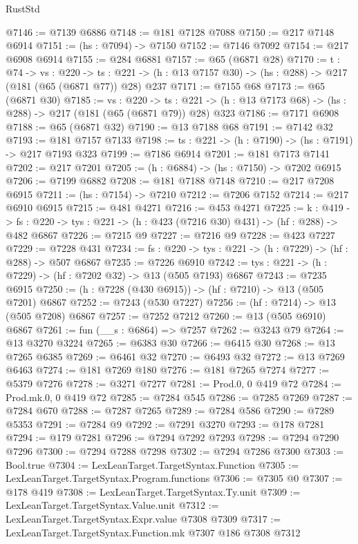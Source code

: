 \begin{lexlean}{RustStd}
\begin{coremodule}
@7146 := @7139 @6886
@7148 := @181 @7128 @7088
@7150 := @217 @7148 @6914
@7151 := (hs : @7094) -> @7150
@7152 := @7146 @7092
@7154 := @217 @6908 @6914
@7155 := @284 @6881
@7157 := @65 (@6871 @28)
@7170 := {t : @74} ->
  {vs : @220} ->
  {ts : @221} -> (h : @13 @7157 @30) -> (hs : @288) -> @217 (@181 (@65 (@6871 @77)) @28) @237
@7171 := @7155 @68
@7173 := @65 (@6871 @30)
@7185 := {vs : @220} ->
  {ts : @221} -> (h : @13 @7173 @68) -> (hs : @288) -> @217 (@181 (@65 (@6871 @79)) @28) @323
@7186 := @7171 @6908
@7188 := @65 (@6871 @32)
@7190 := @13 @7188 @68
@7191 := @7142 @32
@7193 := @181 @7157 @7133
@7198 := {ts : @221} -> (h : @7190) -> (hs : @7191) -> @217 @7193 @323
@7199 := @7186 @6914
@7201 := @181 @7173 @7141
@7202 := @217 @7201
@7205 := (h : @6884) -> (hs : @7150) -> @7202 @6915
@7206 := @7199 @6882
@7208 := @181 @7188 @7148
@7210 := @217 @7208 @6915
@7211 := (hs : @7154) -> @7210
@7212 := @7206 @7152
@7214 := @217 @6910 @6915
@7215 := @481 @4271
@7216 := @453 @4271
@7225 := {k : @419} ->
  {fs : @220} -> {tys : @221} -> (h : @423 (@7216 @30) @431) -> (hf : @288) -> @482 @6867
@7226 := @7215 @9
@7227 := @7216 @9
@7228 := @423 @7227
@7229 := @7228 @431
@7234 := {fs : @220} -> {tys : @221} -> (h : @7229) -> (hf : @288) -> @507 @6867
@7235 := @7226 @6910
@7242 := {tys : @221} -> (h : @7229) -> (hf : @7202 @32) -> @13 (@505 @7193) @6867
@7243 := @7235 @6915
@7250 := (h : @7228 (@430 @6915)) -> (hf : @7210) -> @13 (@505 @7201) @6867
@7252 := @7243 (@530 @7227)
@7256 := (hf : @7214) -> @13 (@505 @7208) @6867
@7257 := @7252 @7212
@7260 := @13 (@505 @6910) @6867
@7261 := fun (__s : @6864) => @7257
@7262 := @3243 @79
@7264 := @13 @3270 @3224
@7265 := @6383 @30
@7266 := @6415 @30
@7268 := @13 @7265 @6385
@7269 := @6461 @32
@7270 := @6493 @32
@7272 := @13 @7269 @6463
@7274 := @181 @7269 @180
@7276 := @181 @7265 @7274
@7277 := @5379 @7276
@7278 := @3271 @7277
@7281 := Prod.{0, 0} @419 @72
@7284 := Prod.mk.{0, 0} @419 @72
@7285 := @7284 @545
@7286 := @7285 @7269
@7287 := @7284 @670
@7288 := @7287 @7265
@7289 := @7284 @586
@7290 := @7289 @5353
@7291 := @7284 @9
@7292 := @7291 @3270
@7293 := @178 @7281
@7294 := @179 @7281
@7296 := @7294 @7292 @7293
@7298 := @7294 @7290 @7296
@7300 := @7294 @7288 @7298
@7302 := @7294 @7286 @7300
@7303 := Bool.true
@7304 := LexLeanTarget.TargetSyntax.Function
@7305 := LexLeanTarget.TargetSyntax.Program.functions
@7306 := @7305 @0
@7307 := @178 @419
@7308 := LexLeanTarget.TargetSyntax.Ty.unit
@7309 := LexLeanTarget.TargetSyntax.Value.unit
@7312 := LexLeanTarget.TargetSyntax.Expr.value @7308 @7309
@7317 := LexLeanTarget.TargetSyntax.Function.mk @7307 @186 @7308 @7312

\end{coremodule}
\end{lexlean}
